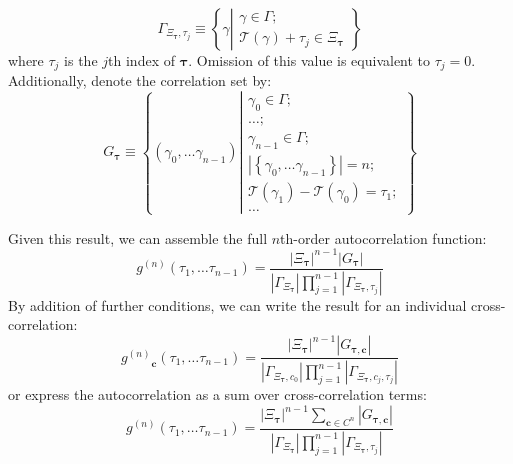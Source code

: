 \documentclass{article}
\newcommand{\braces}[1]{\ensuremath{\left\lbrace #1 \right\rbrace}}
\newcommand{\setbuilder}[2]{\ensuremath{\braces{#1 \left| #2 \right.}}}
\newcommand{\gn}[1]{\ensuremath{g^{(#1)}}}
\renewcommand{\vec}{\boldsymbol}
\newcommand{\abs}[1]{\ensuremath{\left|#1\right|}}
\newcommand{\channel}{\ensuremath{c}}
\newcommand{\channels}{\ensuremath{C}}
\newcommand{\Time}{\ensuremath{\mathcal{T}}}
\newcommand{\photon}{\ensuremath{\gamma}}
\newcommand{\photons}{\ensuremath{\Gamma}}
\newcommand{\integrationtime}{\ensuremath{\Xi}}
\newcommand{\correlationset}{\ensuremath{G}}
\begin{document}
\begin{equation}
\photons_{\integrationtime_{\vec{\tau}},\tau_{j}} 
    \equiv \setbuilder{\photon} 
                      {\begin{aligned}
                       \photon\in\photons; \\
                       \Time(\photon)+\tau_{j}\in\integrationtime_{\vec{\tau}}
                       \end{aligned}}
\end{equation}
where $\tau_{j}$ is the $j$th index of $\vec{\tau}$. Omission of this value is equivalent to $\tau_{j}=0$. Additionally, denote the correlation set by:
\begin{equation}
G_{\vec{\tau}} 
    \equiv \setbuilder{(\photon_{0},\ldots\photon_{n-1})}
                         {\begin{aligned}
                          \photon_{0}\in\photons;\\
                          \ldots;\\
                          \photon_{n-1}\in\photons;\\
                          \abs{\braces{\photon_{0},\ldots\photon_{n-1}}}=n;\\
                          \Time(\photon_{1})-\Time(\photon_{0})=\tau_{1};\\
                          \ldots
                          \end{aligned}}
\end{equation}

Given this result, we can assemble the full $n$th-order autocorrelation function:
\begin{equation}
\gn{n}(\tau_{1},\ldots\tau_{n-1}) = 
   \frac{\abs{\integrationtime_{\vec{\tau}}}^{n-1}
         \abs{G_{\vec{\tau}}}}
        {\abs{\photons_{\integrationtime_{\vec{\tau}}}}
         \prod_{j=1}^{n-1}
               {\abs{\photons_{\integrationtime_{\vec{\tau}},\tau_{j}}}}}
\end{equation}
By addition of further conditions, we can write the result for an individual cross-correlation:
\begin{equation}
\gn{n}_{\vec{\channel}}(\tau_{1},\ldots\tau_{n-1}) = 
   \frac{\abs{\integrationtime_{\vec{\tau}}}^{n-1}
         \abs{\correlationset_{\vec{\tau},\vec{\channel}}}}
        {\abs{\photons_{\integrationtime_{\vec{\tau}},\channel_{0}}}
         \prod_{j=1}^{n-1}
               {\abs{\photons_{\integrationtime_{\vec{\tau}},\channel_{j},\tau_{j}}}}}
\end{equation}
or express the autocorrelation as a sum over cross-correlation terms:
\begin{equation}
\gn{n}(\tau_{1},\ldots\tau_{n-1}) = 
   \frac{\abs{\integrationtime_{\vec{\tau}}}^{n-1}
         \sum_{\vec{\channel}\in\channels^{n}}
         {\abs{G_{\vec{\tau},\vec{\channel}}}}}
        {\abs{\photons_{\integrationtime_{\vec{\tau}}}}
         \prod_{j=1}^{n-1}
               {\abs{\photons_{\integrationtime_{\vec{\tau}},\tau_{j}}}}}
\end{equation}
\end{document}
